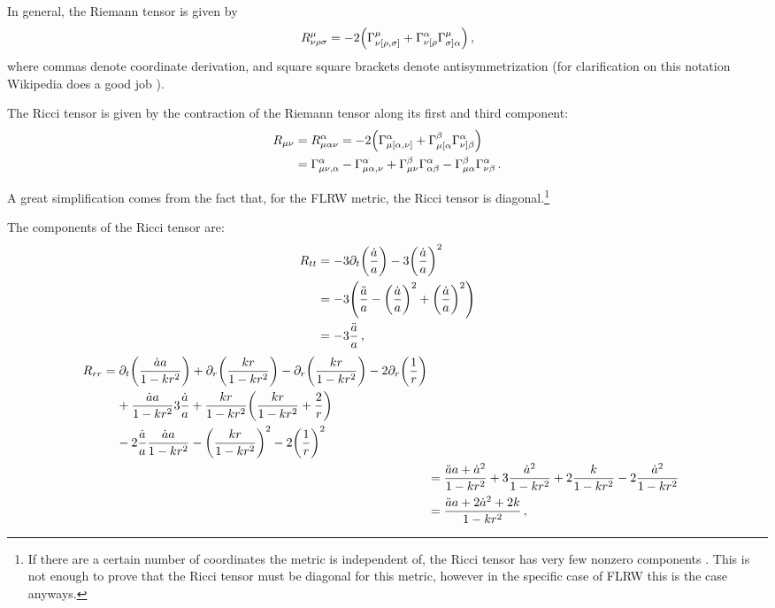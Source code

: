 \documentclass[main.tex]{subfiles}
\begin{document}
In general, the Riemann tensor is given by 
%
\begin{align}
R^{\mu }_{\nu \rho \sigma } = -2 \qty(\Gamma^{\mu }_{\nu [\rho , \sigma ]} + \Gamma^{\alpha }_{\nu [\rho } \Gamma^{\mu }_{\sigma ] \alpha })
\,,
\end{align}
%
where commas denote coordinate derivation, and square square brackets denote antisymmetrization (for clarification on this notation Wikipedia does a good job \cite{AntisymmetricTensor2019}). 

The Ricci tensor is given by the contraction of the Riemann tensor along its first and third component:
%
\begin{align}
R_{\mu \nu } 
&= R^{\alpha }_{\mu \alpha \nu }
= -2 \qty(\Gamma^{\alpha }_{\mu [\alpha , \nu ]} + \Gamma^{\beta }_{\mu [\alpha } \Gamma^{\alpha }_{\nu ] \beta  })  \\
&= \Gamma^{\alpha }_{\mu \nu , \alpha } 
- \Gamma^{\alpha }_{\mu \alpha , \nu }
+ \Gamma^{\beta }_{\mu \nu } \Gamma^{\alpha }_{\alpha \beta } 
- \Gamma^{\beta}_{\mu \alpha } \Gamma^{\alpha }_{\nu \beta }
\,.
\end{align}

A great simplification comes from the fact that, for the FLRW metric, the Ricci tensor is diagonal.\footnote{If there are a certain number of coordinates the metric is independent of, the Ricci tensor has very few nonzero components \cite{winRicciTensorDiagonal1996}. This is not enough to prove that the Ricci tensor must be diagonal for this metric, however in the specific case of FLRW this is the case anyways.}

\begin{claim}
The components of the Ricci tensor are: 
%
\begin{align}
R_{tt} &= - 3 \partial_{t} \qty(\frac{\dot{a}}{a})
- 3 \qty(\frac{\dot{a}}{a})^2  \\
&=-3 \qty(\frac{\ddot{a}}{a} - \qty(\frac{\dot{a}}{a})^2
+ \qty(\frac{\dot{a}}{a})^2)  \\
&= -3 \frac{\ddot{a}}{a}
\,,
\end{align} 
%
\begin{align}
\begin{split}
R_{rr} &= \partial_{t} \qty(\frac{\dot{a} a}{1 - kr^2} )
+ \partial_{r} \qty(\frac{kr}{1 - kr^2})
- \partial_{r} \qty(\frac{kr}{1 - kr^2})
- 2 \partial_{r} \qty(\frac{1}{r}) \\
&\phantom{=}\ 
+ \frac{\dot{a} a}{1 - kr^2} 3 \frac{\dot{a}}{a}
+ \frac{kr}{1-kr^2} \qty(\frac{kr }{1 - kr^2} + \frac{2}{r}) \\
&\phantom{=}\ 
- 2 \frac{\dot{a}}{a} \frac{\dot{a} a}{1 - kr^2}
- \qty(\frac{kr}{1 - kr^2})^2 
- 2 \qty(\frac{1}{r})^2
\end{split}  \\
&= \frac{\ddot{a} a + \dot{a}^2}{1 - kr^2} 
+ 3 \frac{\dot{a}^2}{1 - kr^2}
+ 2 \frac{k}{1 - kr^2}
- 2 \frac{\dot{a}^2}{1 - kr^2}  \\
&= \frac{\ddot{a} a + 2 \dot{a}^2 + 2 k}{1 - kr^2}
\,,
\end{align}
\end{claim}
\end{document}
